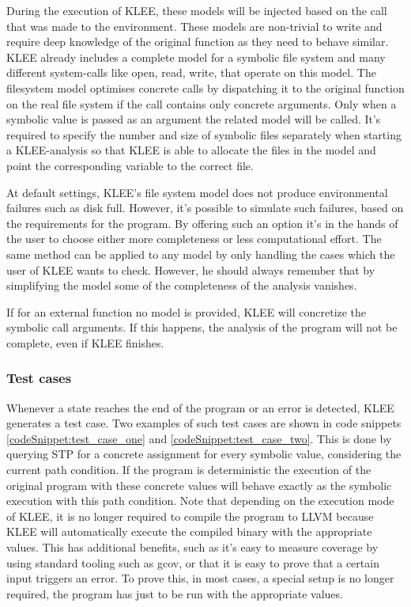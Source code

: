 During the execution of KLEE, these models will be injected based on the call that was made to the environment. These models are non-trivial to write and require deep knowledge of the original function as they need to behave similar. KLEE already includes a complete model for a symbolic file system and many different system-calls like open, read, write, that operate on this model.
The filesystem model optimises concrete calls by dispatching it to the original function on the real file system if the call contains only concrete arguments. Only when a symbolic value is passed as an argument the related model will be called. It's required to specify the number and size of symbolic files separately when starting a KLEE-analysis so that KLEE is able to allocate the files in the model and point the corresponding variable to the correct file.

At default settings, KLEE's file system model does not produce environmental failures such as disk full. However, it's possible to simulate such failures, based on the requirements for the program. By offering such an option it's in the hands of the user to choose either more completeness or less computational effort. The same method can be applied to any model by only handling the cases which the user of KLEE wants to check. However, he should always remember that by simplifying the model some of the completeness of the analysis vanishes.

If for an external function no model is provided, KLEE will concretize the symbolic call arguments. If this happens, the analysis of the program will not be complete, even if KLEE finishes.
\subsubsection{Test cases}
Whenever a state reaches the end of the program or an error is detected, KLEE generates a test case. Two examples of such test cases are shown in code snippets \ref{codeSnippet:test_case_one} and \ref{codeSnippet:test_case_two}. This is done by querying STP for a concrete assignment for every symbolic value, considering the current path condition. If the program is deterministic the execution of the original program with these concrete values will behave exactly as the symbolic execution with this path condition.
Note that depending on the execution mode of KLEE, it is no longer required to compile the program to LLVM because KLEE will automatically execute the compiled binary with the appropriate values. This has additional benefits, such as it's easy to measure coverage by using standard tooling such as gcov, or that it is easy to prove that a certain input triggers an error. To prove this, in most cases, a special setup is no longer required, the program has just to be run with the appropriate values.

